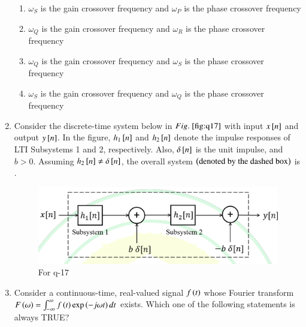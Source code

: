 \documentclass[journal,12pt,onecolumn]{IEEEtran}
\theoremstyle{remark}
\begin{document}
\begin{enumerate}
\hfill{}

\begin{enumerate}
\item $\omega_S$ is the gain crossover frequency and $\omega_P$ is the phase crossover frequency
\item $\omega_Q$ is the gain crossover frequency and $\omega_R$ is the phase crossover frequency
\item $\omega_Q$ is the gain crossover frequency and $\omega_S$ is the phase crossover frequency
\item $\omega_S$ is the gain crossover frequency and $\omega_Q$ is the phase crossover frequency
\end{enumerate}

\item Consider the discrete-time system below in $\figref{fig:q17}$ with input $x{}\left[n\right]$ and output $y{}\left[n\right]$. In the figure, $h_1{}\left[n\right]$ and $h_2{}\left[n\right]$ denote the impulse responses of LTI Subsystems 1 and 2, respectively. Also, $\delta{}\left[n\right]$ is the unit impulse, and $b > 0$. Assuming $h_2{}\left[n\right] \neq \delta{}\left[n\right]$, the overall system $\left(\text{denoted by the dashed box}\right)$ is \underline{\hspace{2cm}}.
\begin{figure}[H]
\centering
\includegraphics[width=0.5\columnwidth]{q17}
\caption{For q-17}
\label{fig:q17}
\end{figure}

\hfill{}

\begin{enumerate}
\end{enumerate}

\item Consider a continuous-time, real-valued signal $f\left(t\right)$ whose Fourier transform $F\left(\omega\right) = \int_{-\infty}^{\infty} f\left(t\right) \exp\left(-j \omega t\right) dt$ exists. Which one of the following statements is always TRUE?


\end{enumerate}
\end{document}
